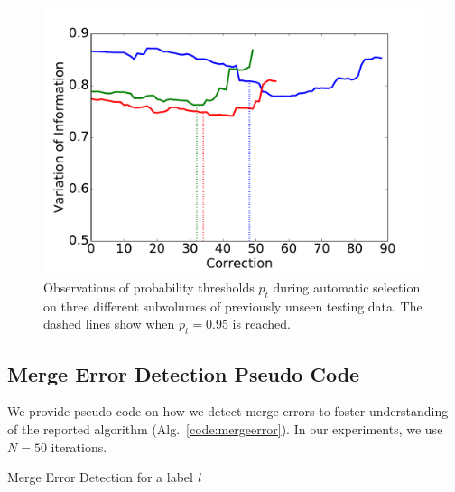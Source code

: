 \begin{figure}[t]
\centering
\includegraphics[width=\linewidth]{gfx/ptplot.pdf}
\caption{Observations of probability thresholds $p_t$ during automatic selection on three different subvolumes of previously unseen testing data. The dashed lines show when $p_t=0.95$ is reached.}
\label{fig:cylboxplot}
\end{figure}

\subsection{Merge Error Detection Pseudo Code}

We provide pseudo code on how we detect merge errors to foster understanding of the reported algorithm (Alg.~\ref{code:mergeerror}). In our experiments, we use $N=50$ iterations.

\begin{algorithm}[H]
\caption{Merge Error Detection for a label \emph{l}}\label{code:mergeerror}
\begin{algorithmic}[1]
	\EndFor

\end{algorithmic}
\end{algorithm}

